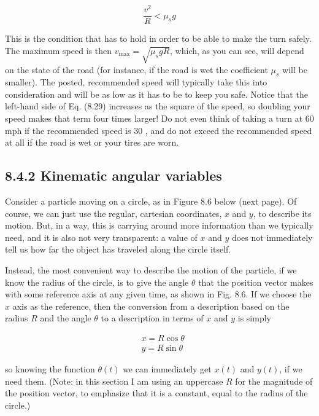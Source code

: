\documentclass[10pt]{article}
\begin{document}
\begin{equation*}
\frac{v^{2}}{R}<\mu_{s} g \tag{8.29}
\end{equation*}


This is the condition that has to hold in order to be able to make the turn safely. The maximum speed is then $v_{\max }=\sqrt{\mu_{s} g R}$, which, as you can see, will depend on the state of the road (for instance, if the road is wet the coefficient $\mu_{s}$ will be smaller). The posted, recommended speed will typically take this into consideration and will be as low as it has to be to keep you safe. Notice that the left-hand side of Eq. (8.29) increases as the square of the speed, so doubling your speed makes that term four times larger! Do not even think of taking a turn at 60 mph if the recommended speed is 30 , and do not exceed the recommended speed at all if the road is wet or your tires are worn.

\subsection*{8.4.2 Kinematic angular variables}
Consider a particle moving on a circle, as in Figure 8.6 below (next page). Of course, we can just use the regular, cartesian coordinates, $x$ and $y$, to describe its motion. But, in a way, this is carrying around more information than we typically need, and it is also not very transparent: a value of $x$ and $y$ does not immediately tell us how far the object has traveled along the circle itself.

Instead, the most convenient way to describe the motion of the particle, if we know the radius of the circle, is to give the angle $\theta$ that the position vector makes with some reference axis at any given time, as shown in Fig. 8.6. If we choose the $x$ axis as the reference, then the conversion from a description based on the radius $R$ and the angle $\theta$ to a description in terms of $x$ and $y$ is simply


\begin{align*}
& x=R \cos \theta \\
& y=R \sin \theta \tag{8.30}
\end{align*}


so knowing the function $\theta(t)$ we can immediately get $x(t)$ and $y(t)$, if we need them. (Note: in this section I am using an uppercase $R$ for the magnitude of the position vector, to emphasize that it is a constant, equal to the radius of the circle.)
\end{document}
